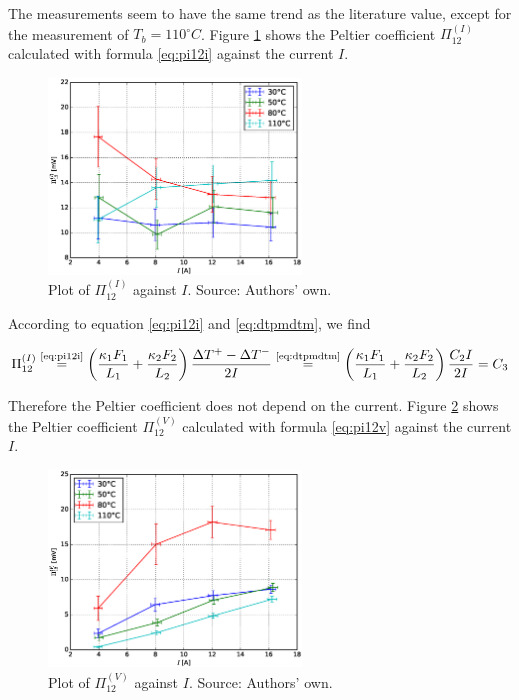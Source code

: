 \documentclass[a4paper]{article}
\begin{document}
The measurements seem to have the same trend as the literature value, except for the measurement of $T_b = 110^{\circ}C$.
\newline
Figure \ref{fig:pi12ivsi} shows the Peltier coefficient $\Pi_{12}^{(I)}$ calculated with formula \eqref{eq:pi12i} against the current $I$.

\begin{figure}[H]
\centering
\includegraphics[width=0.6\textwidth]{plots/Pi12I_vs_I.eps}
\caption{Plot of $\Pi_{12}^{(I)}$ against $I$. Source: Authors' own.}
\label{fig:pi12ivsi}
\end{figure}

According to equation \eqref{eq:pi12i} and \eqref{eq:dtpmdtm}, we find

\begin{equation}
\Pi_{12}^{(I)} \overset{\text{\ref{eq:pi12i}}}{=} \left( \frac{\kappa_1 F_1}{L_1} + \frac{\kappa_2 F_2}{L_2} \right) \frac{\Delta T^{+} - \Delta T^{-}}{2 I} \overset{\text{\ref{eq:dtpmdtm}}}{=} \left( \frac{\kappa_1 F_1}{L_1} + \frac{\kappa_2 F_2}{L_2} \right) \frac{C_2 I}{2 I} = C_3
\end{equation}

Therefore the Peltier coefficient does not depend on the current.
\newline
Figure \ref{fig:pi12vvsi} shows the Peltier coefficient $\Pi_{12}^{(V)}$ calculated with formula \eqref{eq:pi12v} against the current $I$.

\begin{figure}[H]
\centering
\includegraphics[width=0.6\textwidth]{plots/Pi12V_vs_I.eps}
\caption{Plot of $\Pi_{12}^{(V)}$ against $I$. Source: Authors' own.}
\label{fig:pi12vvsi}
\end{figure}
\end{document}
